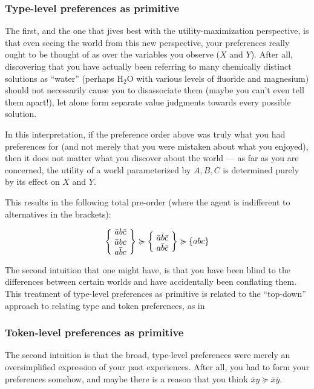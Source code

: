 \documentclass{book}
\newcommand\geqc{\succcurlyeq}
\begin{document}
	\subsubsection*{Type-level preferences as primitive}
	The first, and the one that jives best with the utility-maximization perspective, is that even seeing the world from this new perspective, your preferences really ought to be thought of as over the variables you observe ($X$ and $Y$). After all, discovering that you have actually been referring to many chemically distinct solutions as ``water'' (perhaps H$_2$O with various levels of fluoride and magnesium) should not necessarily cause you to disassociate them (maybe you can't even tell them apart!), let alone form separate value judgments towards every possible solution.
	
	In this interpretation, if the preference order above was truly what you had preferences for (and not merely that you were mistaken about what you enjoyed), then it does not matter what you discover about the world --- as far as you are concerned, the utility of a world parameterized by $A,B,C$ is determined purely by its effect on $X$ and $Y$. 
	
	This results in the following total pre-order (where the agent is indifferent to alternatives in the brackets):
	
	\[ \left\{~\parbox[c]{0.5cm}{$\bar a b \bar c$\\$\bar a b c$ \\ $a \bar b c$}~\right\} \geqc \left\{~\parbox[c]{0.5cm}{$\bar a \bar b \bar c$ \\ $a \bar b \bar c$}~\right\} \geqc \left\{abc \right\} \]
	
	The second intuition that one might have, is that you have been blind to the differences between certain worlds and have accidentally been conflating them. This treatment of type-level preferences as primitive is related to the ``top-down'' approach to relating type and token preferences, as in \cite[chapter 4, pg 55]{girard2008modal}
	
	\subsubsection*{Token-level preferences as primitive}
	
	The second intuition is that the broad, type-level preferences were merely an oversimplified expression of your past experiences. After all, you had to form your preferences somehow, and maybe there is a reason that you think  $\bar x y \geqc \bar x \bar y$.
	
\end{document}
